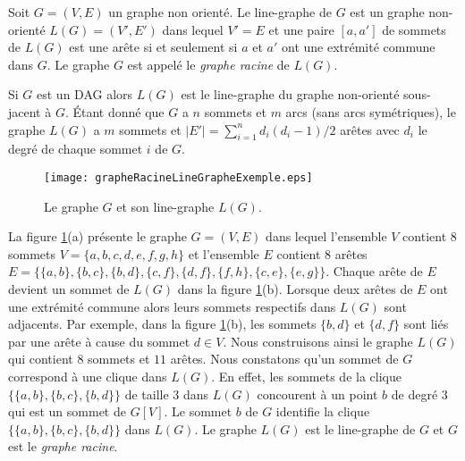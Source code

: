 
\begin{definition}
\label{definitionLineGraphe}
Soit $G = (V, E)$ un graphe non orient\'e.
\newline
Le line-graphe de $G$ est un graphe non-orient\'e $L(G) = (V',E')$ dans lequel 
$V'=E$ et 
une paire $[a,a']$ de sommets de $L(G)$ est une ar\^ete si et seulement si $a$ et $a'$ ont une extr\'emit\'e commune dans $G$.
\newline
Le graphe $G$ est appel\'e le {\em graphe racine} de $L(G)$.
\end{definition}

Si $G$ est un DAG alors  $L(G)$ est le line-graphe du graphe non-orient\'e sous-jacent \`a $G$.
\'Etant donn\'e que $G$ a $n$ sommets et $m$ arcs (sans arcs sym\'etriques), le graphe $L(G)$ a $m$ sommets et $|E'| = \sum_{i=1 }^{n} d_i(d_i -1)/2$ ar\^etes avec $d_i$ le degr\'e de chaque sommet $i$ de $G$.
\vspace{-0.3cm}

\begin{figure}[htb!]\vspace{-0.5em}
	\centering
	\texttt{[image: grapheRacineLineGrapheExemple.eps]}\vspace{-0.5em}
	\caption{ Le graphe $G$ et son line-graphe $L(G)$. 
			}\vspace{-0.5em}
	\label{grapheRacineLineGrapheExemple}
\end{figure}
\FloatBarrier
\vspace{0.3cm}

La figure \ref{grapheRacineLineGrapheExemple}(a) pr\'esente le graphe $G=(V,E)$ dans lequel l'ensemble $V$ contient $8$ sommets $V=\{a,b,c,d,e,f,g,h\}$ et l'ensemble $E$ contient $8$ ar\^etes \\ $E=\{ \{a,b\}, \{b,c\}, \{b,d\}, \{c,f\}, \{d,f\}, \{f,h\}, \{c,e\},\{e,g\} \}$. 
Chaque ar\^ete de $E$ devient un sommet de $L(G)$ dans la figure \ref{grapheRacineLineGrapheExemple}(b). Lorsque deux ar\^etes de $E$ ont une extr\'emit\'e  commune alors leurs sommets respectifs dans $L(G)$  sont adjacents.
Par exemple, dans la figure \ref{grapheRacineLineGrapheExemple}(b), les sommets $\{b,d\}$ et $\{d,f\}$ sont li\'es par une ar\^ete \`a cause du sommet $d \in V$. 
Nous construisons ainsi le graphe $L(G)$  qui contient $8$ sommets et $11$ ar\^etes.
Nous constatons qu'un sommet de $G$ correspond \`a une clique dans $L(G)$. 
En effet, les sommets de la clique $\{ \{a,b\},  \{b,c\},  \{b,d\} \}$ de taille $3$ dans $L(G)$ concourent \`a un point $b$ de degr\'e $3$ qui est un sommet de $G[V]$. Le sommet  $b$ de $G$  identifie la clique $\{ \{a,b\},  \{b,c\},  \{b,d\} \}$ dans $L(G)$.
Le graphe $L(G)$ est le  line-graphe de $G$ et $G$ est le {\em graphe racine}.
\newline

